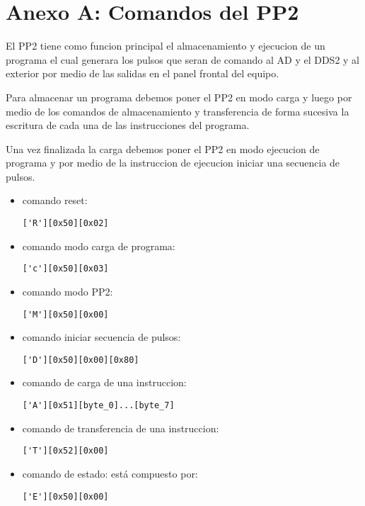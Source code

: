 \section{Anexo A: Comandos del PP2}

El PP2 tiene como funcion principal el almacenamiento y ejecucion de un 
programa el cual generara los pulsos que seran de comando al AD y el DDS2
y al exterior por medio de las salidas en el panel frontal del equipo.
 
Para almacenar un programa debemos poner el PP2 en modo carga y luego
por medio de los comandos de almacenamiento y transferencia de forma sucesiva
la escritura de cada una de las instrucciones del programa.

Una vez finalizada la carga debemos poner el PP2 en modo ejecucion de programa
y por medio de la instruccion de ejecucion iniciar una secuencia de pulsos.

\begin{itemize}
\item comando reset: \begin{verbatim}['R'][0x50][0x02]\end{verbatim}
\item comando modo carga de programa: \begin{verbatim}['c'][0x50][0x03]\end{verbatim}
\item comando modo PP2: \begin{verbatim}['M'][0x50][0x00]\end{verbatim}
\item comando iniciar secuencia de pulsos: \begin{verbatim}['D'][0x50][0x00][0x80]\end{verbatim}
\item comando de carga de una instruccion: \begin{verbatim}['A'][0x51][byte_0]...[byte_7]\end{verbatim}
\item comando de transferencia de una instruccion: \begin{verbatim}['T'][0x52][0x00]\end{verbatim}
\item comando de estado: está compuesto por: \begin{verbatim}['E'][0x50][0x00]\end{verbatim}
\end{itemize}
\newpage
